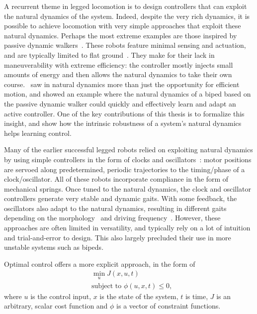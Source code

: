 A recurrent theme in legged locomotion is to design controllers that can exploit the natural dynamics of the system. Indeed, despite the very rich dynamics, it is possible to achieve locomotion with very simple approaches that exploit these natural dynamics.
Perhaps the most extreme examples are those inspired by passive dynamic walkers~\cite{mcgeer1990passive}. These robots feature minimal sensing and actuation, and are typically limited to flat ground~\cite{bhounsule2012design,wisse2006design}. They make for their lack in maneuverability with extreme efficiency: the controller mostly injects small amounts of energy and then allows the natural dynamics to take their own course.~\textcite{tedrake2005learning} saw in natural dynamics more than just the opportunity for efficient motion, and showed an example where the natural dynamics of a biped based on the passive dynamic walker could quickly and effectively learn and adapt an active controller. One of the key contributions of this thesis is to formalize this insight, and show how the intrinsic robustness of a system's natural dynamics helps learning control. \par
Many of the earlier successful legged robots relied on exploiting natural dynamics by using simple controllers in the form of clocks and oscillators~\cite{sprowitz2013towards,buchli2006resonance,altendorfer2001rhex,owaki2013simple}: motor positions are servoed along predetermined, periodic trajectories to the timing/phase of a clock/oscillator. All of these robots incorporate compliance in the form of mechanical springs. Once tuned to the natural dynamics, the clock and oscillator controllers generate very stable and dynamic gaits. With some feedback, the oscillators also adapt to the natural dynamics, resulting in different gaits depending on the morphology~\cite{owaki2013simple} and driving frequency~\cite{owaki2017quadruped}. %
However, these approaches are often limited in versatility, and typically rely on a lot of intuition and trial-and-error to design. This also largely precluded their use in more unstable systems such as bipeds. \par
Optimal control offers a more explicit approach, in the form of
\begin{align*}
& \min_{u} J(x, u, t) \\
& \text{subject to } \phi(u, x, t) \leq 0,
\end{align*}
where $u$ is the control input, $x$ is the state of the system, $t$ is time, $J$ is an arbitrary, scalar cost function and $\phi$ is a vector of constraint functions.
